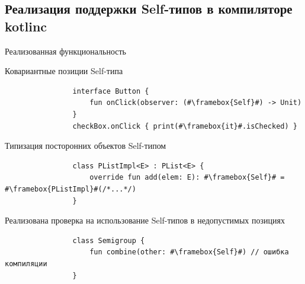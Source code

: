 \documentclass[usenames, dvipsnames]{beamer}
\begin{document}
    \subsection{Реализация поддержки Self-типов в компиляторе kotlinc}

    \begin{frame}[fragile]{Реализованная функциональность}

        \begin{block}{Ковариантные позиции Self-типа}
            \begin{verbatim}
                interface Button {
                    fun onClick(observer: (#\framebox{Self}#) -> Unit)
                }
                checkBox.onClick { print(#\framebox{it}#.isChecked) }
            \end{verbatim}
        \end{block}
        \begin{block}{Типизация посторонних объектов Self-типом}
            \begin{verbatim}
                class PListImpl<E> : PList<E> {
                    override fun add(elem: E): #\framebox{Self}# = #\framebox{PListImpl}#(/*...*/)
                }
            \end{verbatim}
        \end{block}
        \begin{block}{Реализована проверка на использование Self-типов в недопустимых позициях}
            \begin{verbatim}
                class Semigroup {
                    fun combine(other: #\framebox{Self}#) // ошибка компиляции
                }
            \end{verbatim}
        \end{block}
    \end{frame}
\end{document}
